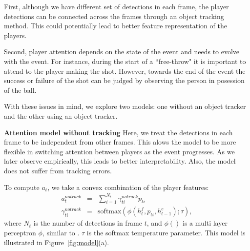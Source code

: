 First, although we have different set of detections in each frame, the player
detections can be connected across the frames through an object tracking
method. This could potentially lead to better feature representation of the
players.

Second, player attention depends on the state of the event and needs to evolve
with the event.  For instance, during the start of a ``free-throw" it is
important to attend to the player making the shot. However, towards the end of
the event the success or failure of the shot can be judged by observing the
person in posession of the ball.

With these issues in mind, we explore two models:
one without an object tracker and the other using an object tracker.


\noindent \textbf{Attention model without tracking}
Here, we treat the detections in each frame to be independent from other
frames.  This alows the model to be more flexible in switching attention
between players as the event progresses.  As we later observe empirically, this
leads to better interpretability.  Also, the model does not suffer from
tracking errors.

To compute $a_t$, we take a convex combination of the player features:
\begin{eqnarray} 
\label{eq:notrack}
  a_t^{notrack} & = & \sum_{i=1}^{N_t} \gamma_{ti}^{notrack} p_{ti} 
\\ \nonumber
  \gamma_{ti}^{notrack} & = & \text{softmax} \left(\phi\left(h^f_t, p_{ti}, h^e_{t-1}\right); \tau\right),
\end{eqnarray}
where $N_t$ is the number of detections in frame $t$,
and $\phi()$ is a 
multi layer perceptron $\phi$, similar to
\cite{Bahdnau_arxiv14}. 
$\tau$ is the softmax temperature parameter.
This model is illustrated in Figure~\ref{fig:model}(a).

